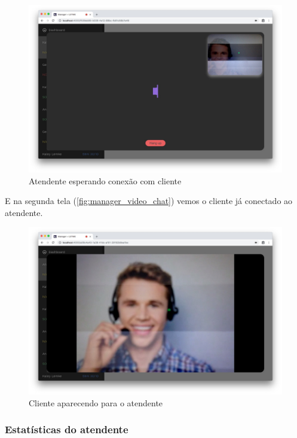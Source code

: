 \begin{figure}[ht!]
	\centering
    \includegraphics[scale=0.25]{figures/screens/manager-video-overlay.jpg}
	\caption{Atendente esperando conexão com cliente}
	\label{fig:manager_video_overlay}
\end{figure}

E na segunda tela (\autoref{fig:manager_video_chat}) vemos o cliente já conectado ao atendente.

\begin{figure}[ht!]
	\centering
    \includegraphics[scale=0.25]{figures/screens/manager-video-chat.jpg}
	\caption{Cliente aparecendo para o atendente}
	\label{fig:manager_video_chat}
\end{figure}

\subsubsection{Estatísticas do atendente}

